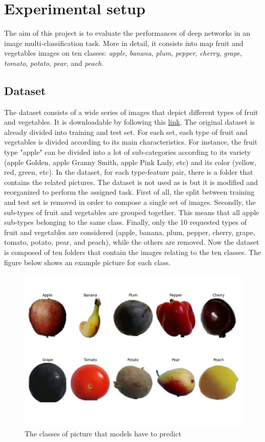 \section{Experimental setup}\label{header-n31}

The aim of this project is to evaluate the performances of deep networks
in an image multi-classification task. More in detail, it consists into
map fruit and vegetables images on ten classes: \emph{apple},
\emph{banana}, \emph{plum}, \emph{pepper}, \emph{cherry}, \emph{grape},
\emph{tomato}, \emph{potato}, \emph{pear}, and \emph{peach}.

\subsection{Dataset}\label{header-n33}

The dataset consists of a wide series of images that depict different
types of fruit and vegetables. It is downloadable by following this
\href{https://www.kaggle.com/moltean/fruits}{link}. The original dataset
is already divided into training and test set. For each set, each type
of fruit and vegetables is divided according to its main characteristics.
For instance, the fruit type "apple" can be divided into a lot of
sub-categories according to its variety (apple Golden, apple Granny
Smith, apple Pink Lady, etc) and its color (yellow, red, green, etc). In
the dataset, for each type-feature pair, there is a folder that contains
the related pictures. The dataset is not used as is but it is modified
and reorganized to perform the assigned task. First of all, the split
between training and test set is removed in order to compose a single
set of images. Secondly, the sub-types of fruit and vegetables are
grouped together. This means that all apple sub-types belonging to the
same class. Finally, only the 10 requested types of fruit and vegetables
are considered (apple, banana, plum, pepper, cherry, grape, tomato,
potato, pear, and peach), while the others are removed. Now the dataset is
composed of ten folders that contain the images relating to the ten
classes. The figure below shows an example picture for each class.

\begin{figure}[h!]
\centering
\includegraphics[width=0.9\linewidth]{../images/fruit-categories.png}
\caption{The classes of picture that models have to predict}
\end{figure}


